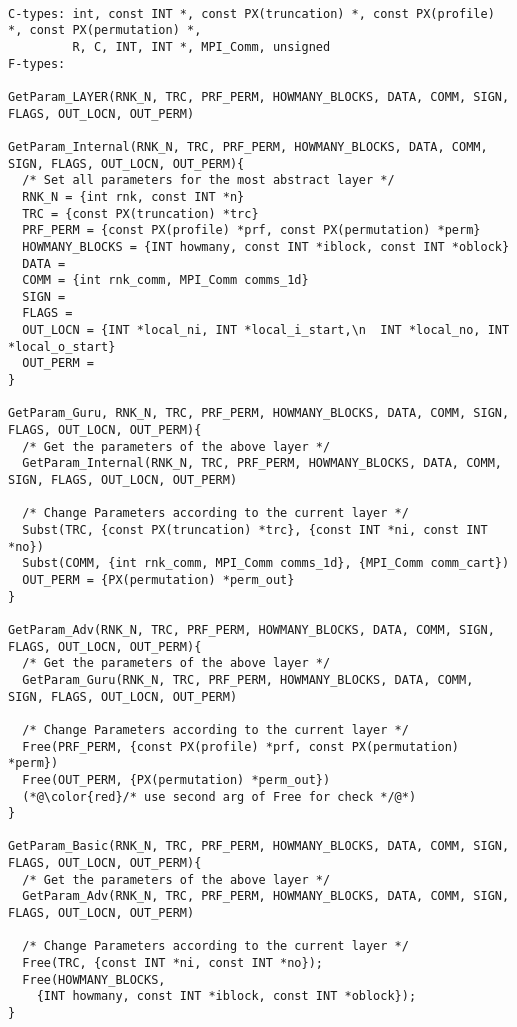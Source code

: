 \begin{lstlisting}

C-types: int, const INT *, const PX(truncation) *, const PX(profile) *, const PX(permutation) *,
         R, C, INT, INT *, MPI_Comm, unsigned
F-types:

GetParam_LAYER(RNK_N, TRC, PRF_PERM, HOWMANY_BLOCKS, DATA, COMM, SIGN, FLAGS, OUT_LOCN, OUT_PERM)

GetParam_Internal(RNK_N, TRC, PRF_PERM, HOWMANY_BLOCKS, DATA, COMM, SIGN, FLAGS, OUT_LOCN, OUT_PERM){
  /* Set all parameters for the most abstract layer */
  RNK_N = {int rnk, const INT *n}
  TRC = {const PX(truncation) *trc}
  PRF_PERM = {const PX(profile) *prf, const PX(permutation) *perm}
  HOWMANY_BLOCKS = {INT howmany, const INT *iblock, const INT *oblock}
  DATA =
  COMM = {int rnk_comm, MPI_Comm comms_1d}
  SIGN =
  FLAGS =
  OUT_LOCN = {INT *local_ni, INT *local_i_start,\n  INT *local_no, INT *local_o_start}
  OUT_PERM =
}

GetParam_Guru, RNK_N, TRC, PRF_PERM, HOWMANY_BLOCKS, DATA, COMM, SIGN, FLAGS, OUT_LOCN, OUT_PERM){
  /* Get the parameters of the above layer */
  GetParam_Internal(RNK_N, TRC, PRF_PERM, HOWMANY_BLOCKS, DATA, COMM, SIGN, FLAGS, OUT_LOCN, OUT_PERM)

  /* Change Parameters according to the current layer */
  Subst(TRC, {const PX(truncation) *trc}, {const INT *ni, const INT *no})
  Subst(COMM, {int rnk_comm, MPI_Comm comms_1d}, {MPI_Comm comm_cart})
  OUT_PERM = {PX(permutation) *perm_out}
}

GetParam_Adv(RNK_N, TRC, PRF_PERM, HOWMANY_BLOCKS, DATA, COMM, SIGN, FLAGS, OUT_LOCN, OUT_PERM){
  /* Get the parameters of the above layer */
  GetParam_Guru(RNK_N, TRC, PRF_PERM, HOWMANY_BLOCKS, DATA, COMM, SIGN, FLAGS, OUT_LOCN, OUT_PERM)

  /* Change Parameters according to the current layer */
  Free(PRF_PERM, {const PX(profile) *prf, const PX(permutation) *perm})
  Free(OUT_PERM, {PX(permutation) *perm_out})
  (*@\color{red}/* use second arg of Free for check */@*)
}

GetParam_Basic(RNK_N, TRC, PRF_PERM, HOWMANY_BLOCKS, DATA, COMM, SIGN, FLAGS, OUT_LOCN, OUT_PERM){
  /* Get the parameters of the above layer */
  GetParam_Adv(RNK_N, TRC, PRF_PERM, HOWMANY_BLOCKS, DATA, COMM, SIGN, FLAGS, OUT_LOCN, OUT_PERM)

  /* Change Parameters according to the current layer */
  Free(TRC, {const INT *ni, const INT *no});
  Free(HOWMANY_BLOCKS,
    {INT howmany, const INT *iblock, const INT *oblock});
}


\end{lstlisting}
